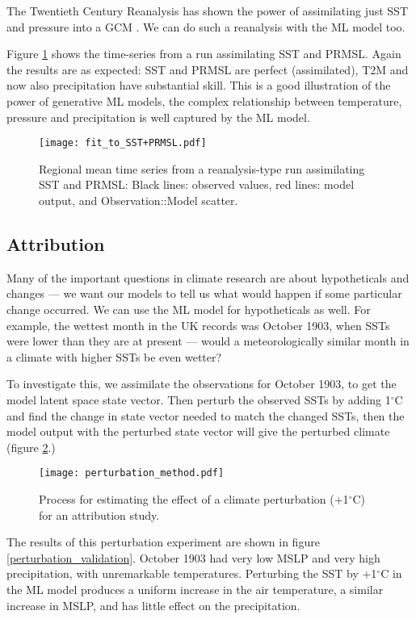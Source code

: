 \documentclass{ametsocV6.1}
\begin{document}
The Twentieth Century Reanalysis has shown the power of assimilating just SST and pressure into a GCM \citep{slivinski_20crv3.1}. We can do such a reanalysis with the ML model too.

Figure \ref{fit_to_SST+PRMSL} shows the time-series from a run assimilating SST and PRMSL. Again the results are as expected: SST and PRMSL are perfect (assimilated), T2M and now also precipitation have substantial skill. This is a good illustration of the power of generative ML models, the complex relationship between temperature, pressure and precipitation is well captured by the ML model.

\begin{figure}[h]
\texttt{[image: fit\_to\_SST+PRMSL.pdf]}
\caption{Regional mean time series from a reanalysis-type run assimilating SST and PRMSL: Black lines: observed values, red lines: model output, and Observation::Model scatter.}
\label{fit_to_SST+PRMSL}
\end{figure}

\subsection{Attribution}

Many of the important questions in climate research are about hypotheticals and changes --- we want our models to tell us what would happen if some particular change occurred. We can use the ML model for hypotheticals as well. For example, the wettest month in the UK records was October 1903, when SSTs were lower than they are at present --- would a meteorologically similar month in a climate with higher SSTs be even wetter?

To investigate this, we assimilate the observations for October 1903, to get the model latent space state vector. Then perturb the observed SSTs by adding 1$^\circ$C and find the change in state vector needed to match the changed SSTs, then the model output with the perturbed state vector will give the perturbed climate (figure \ref{perturbation_method}.)

\begin{figure}[h]
\texttt{[image: perturbation\_method.pdf]}
\caption{Process for estimating the effect of a climate perturbation (+1$^\circ$C) for an attribution study.}
\label{perturbation_method}
\end{figure}

The results of this perturbation experiment are shown in figure \ref{perturbation_validation}. October 1903 had very low MSLP and very high precipitation, with unremarkable temperatures. Perturbing the SST by +1$^\circ$C in the ML model produces a uniform increase in the air temperature, a similar increase in MSLP, and has little effect on the precipitation. 
\end{document}
